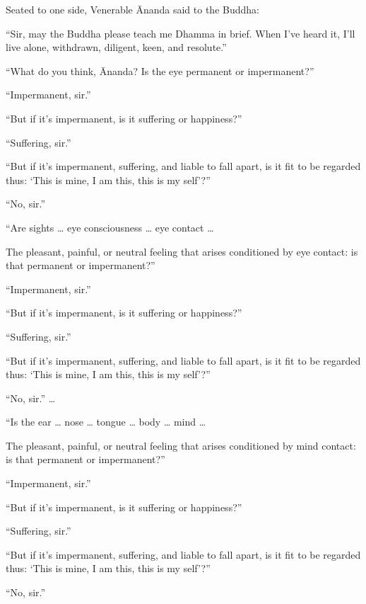 \documentclass[12pt,openany]{book}%
\begin{document}
Seated to one side, Venerable Ānanda said to the Buddha: 

“Sir, may the Buddha please teach me Dhamma in brief. When I’ve heard it, I’ll live alone, withdrawn, diligent, keen, and resolute.” 

“What do you think, Ānanda? Is the eye permanent or impermanent?” 

“Impermanent, sir.” 

“But if it’s impermanent, is it suffering or happiness?” 

“Suffering, sir.” 

“But if it’s impermanent, suffering, and liable to fall apart, is it fit to be regarded thus: ‘This is mine, I am this, this is my self’?” 

“No, sir.” 

“Are sights … eye consciousness … eye contact … 

The pleasant, painful, or neutral feeling that arises conditioned by eye contact: is that permanent or impermanent?” 

“Impermanent, sir.” 

“But if it’s impermanent, is it suffering or happiness?” 

“Suffering, sir.” 

“But if it’s impermanent, suffering, and liable to fall apart, is it fit to be regarded thus: ‘This is mine, I am this, this is my self’?” 

“No, sir.” … 

“Is the ear … nose … tongue … body … mind … 

The pleasant, painful, or neutral feeling that arises conditioned by mind contact: is that permanent or impermanent?” 

“Impermanent, sir.” 

“But if it’s impermanent, is it suffering or happiness?” 

“Suffering, sir.” 

“But if it’s impermanent, suffering, and liable to fall apart, is it fit to be regarded thus: ‘This is mine, I am this, this is my self’?” 

“No, sir.” 
\end{document}

